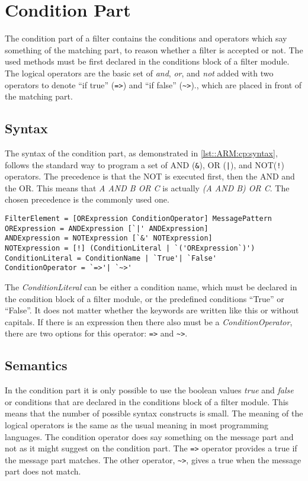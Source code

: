 \chapter{Condition Part} \label{chapter:conditionpart}
The condition part of a filter contains the conditions and operators which say something of the matching part, to reason whether a filter is accepted or not. 
The used methods must be first declared in the conditions block of a filter module. The logical operators are the basic set of \emph{and}, \emph{or}, and \emph{not} added with
two operators to denote ``if true'' (\lstinline[language=Composestar]|=>|) and ``if false'' (\lstinline[language=Composestar]|~>|)., which are placed in front of the matching part.

\section*{Syntax}
The syntax of the condition part, as demonstrated in \autoref{lst::ARM:cp:syntax}, follows the standard way to
program a set of AND (\lstinline|&|), OR (\lstinline$|$), and NOT(\lstinline|!|) operators. The precedence is that the NOT is executed first, then the AND and the OR. This means
that \emph{A AND B OR C} is actually \emph{(A AND B) OR C}. The chosen precedence is the commonly used one.

\begin{lstlisting}[caption={Filter condition part syntax},label=lst::ARM:cp:syntax,style=listing,language=ebnf,float=tpb]
FilterElement = [ORExpression ConditionOperator] MessagePattern
ORExpression = ANDExpression [`|' ANDExpression]
ANDExpression = NOTExpression [`&' NOTExpression]
NOTExpression = [!] (ConditionLiteral | `('ORExpression`)')
ConditionLiteral = ConditionName | `True'| `False'
ConditionOperator = `=>'| `~>'
\end{lstlisting}

The \emph{ConditionLiteral} can be either a condition name, which must be declared in the condition block of a filter module,
or the predefined conditions ``True'' or ``False''. It does not matter whether the keywords are written like this or without
capitals. If there is an expression then there also must be a \emph{ConditionOperator}, there are two options for this
operator: \lstinline[language=Composestar]|=>| and \lstinline[language=Composestar]|~>|.

\section*{Semantics}
In the condition part it is only possible to use the boolean values \emph{true} and \emph{false} or conditions that are declared in the conditions block of a filter module.
This means that the number of possible syntax constructs is small.
The meaning of the logical operators is the same as the usual meaning in most programming languages. The condition operator
does say something on the message part and not as it might suggest on the condition part. The \lstinline|=>| operator
provides a true if the message part matches. The other operator, \lstinline[language=Composestar]|~>|,
gives a true when the message part does not match.


